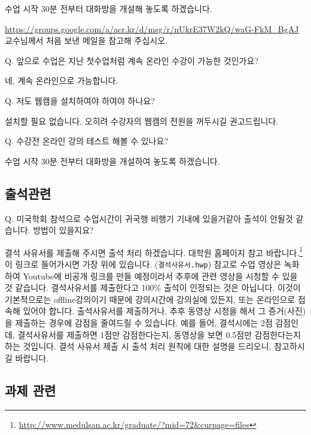 \documentclass[10pt,]{krantz}
\renewenvironment{quote}{\begin{VF}}{\end{VF}}
\renewcommand{\href}[2]{#2\footnote{\url{#1}}}
\begin{document}
수업 시작 30분 전부터 대화방을 개설해 놓도록 하겠습니다.

\url{https://groups.google.com/a/acr.kr/d/msg/r/nUkrE37W2kQ/waG-FkM_BgAJ}
교수님께서 처음 보낸 메일을 참고해 주십시오.

\begin{quote}
Q. 앞으로 수업은 지난 첫수업처럼 계속 온라인 수강이 가능한 것인가요?
\end{quote}

네, 계속 온라인으로 가능합니다.

\begin{quote}
Q. 저도 웹캠을 설치하여야 하여야 하나요?
\end{quote}

설치할 필요 없습니다. 오히려 수강자의 웹캠의 전원을 꺼두시길
권고드립니다.

\begin{quote}
Q. 수강전 온라인 강의 테스트 해볼 수 있나요?
\end{quote}

수업 시작 30분 전부터 대화방을 개설하여 놓도록 하겠습니다.

\subsection*{출석관련}


\begin{quote}
Q. 미국학회 참석으로 수업시간이 귀국행 비행기 기내에 있을거같아 출석이
안될것 같습니다. 방법이 있을지요?
\end{quote}

결석 사유서를 제출해 주시면 출석 처리 하겠습니다.
\href{http://www.medulsan.ac.kr/graduate/?mid=72\&curpage=files}{대학원
홈페이지 참고 바랍니다.} 이 링크로 들어가시면 가장 위에 있습니다.
(\texttt{결석사유서.hwp}) 참고로 수업 영상은 녹화하여 Youtube에 비공개
링크를 만들 예정이라서 추후에 관련 영상을 시청할 수 있을 것 같습니다.
결석사유서를 제출한다고 100\% 출석이 인정되는 것은 아닙니다. 이것이
기본적으로는 offline강의이기 때문에 강의시간에 강의실에 있든지, 또는
온라인으로 접속해 있어야 합니다. 출석사유서를 제출하거나, 추후 동영상
시청을 해서 그 증거(사진)을 제출하는 경우에 감점을 줄여드릴 수 있습니다.
예를 들어, 결석시에는 2점 감점인데, 결석사유서를 제출하면 1점만
감점한다는지, 동영상을 보면 0.5점만 감점한다는지 하는 것입니다. 결석
사유서 제출 시 출석 처리 원칙에 대한 설명을 드리오니, 참고하시길
바랍니다.

\subsection*{과제 관련}\label{-}
\end{document}
